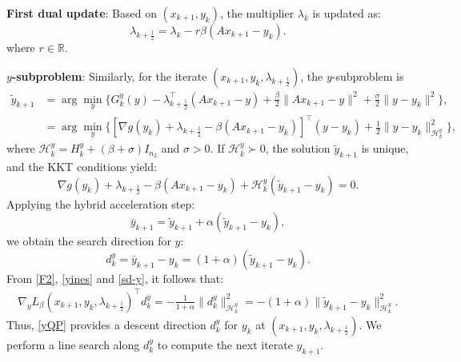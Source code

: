 \documentclass[pdflatex,sn-mathphys-num]{sn-jnl}%
\theoremstyle{thmstyleone}%
\theoremstyle{thmstyletwo}%
\theoremstyle{thmstylethree}%
\begin{document}
\textbf{First dual update}: Based on $(x_{k+1},y_k)$, the multiplier $\lambda_{k}$ is updated as:
\begin{equation}\label{lambda1}
\lambda_{k+\frac{1}{2}} = \lambda_{k}-r \beta(A x_{k+1}-y_{k}).
\end{equation}
where $r\in \mathbb{R}$.

\textbf{$y$-subproblem}: Similarly, for the iterate $(x_{k+1},y_k,\lambda_{k+\frac{1}{2}})$, the $y$-subproblem is
\begin{align}
\tilde{y}_{k+1}&=\arg\min_y\{G_k^g(y)-\lambda_{k+\frac{1}{2}}^{\top}(A x_{k+1}-y)+\frac{\beta}{2}\|A x_{k+1}-y\|^2+\frac{\sigma}{2}\|y-y_{k}\|^{2}\},\nonumber\\
&=\arg\min_y\{[\nabla g (y_{k})+\lambda_{k+\frac{1}{2}}-\beta(A x_{k+1}-y_{k})]^{\top}(y-y_{k})+\frac{1}{2}\|y-y_{k}\|_{\mathcal{H}_k^y}^{2}\},\label{yQP}
\end{align}
where $\label{yQP_H}\mathcal{H}_k^y=H_k^y+(\beta+\sigma) I_{n_2}$ and $\sigma>0$. If $\mathcal{H}_k^y\succ0$, the solution $\tilde{y}_{k+1}$ is unique, and the KKT conditions yield:
\begin{equation}\label{yoc}
\nabla g (y_{k})+\lambda_{k+\frac{1}{2}}-\beta(A x_{k+1}-y_{k})+\mathcal{H}_k^y(\tilde{y}_{k+1}-y_{k})=0.
\end{equation}
Applying the hybrid acceleration step:
\begin{equation}\label{yines}
\bar{y}_{k+1}=\tilde{y}_{k+1}+\alpha(\tilde{y}_{k+1}-y_{k}),
\end{equation}
we obtain the search direction for $y$:
\begin{equation}\label{sd-y}
d_{k}^{y} = \bar{y}_{k+1}-y_{k}=(1+\alpha)(\tilde{y}_{k+1}-y_{k}).
\end{equation}
From \eqref{F2}, \eqref{yines} and \eqref{sd-y}, it follows that:
\[\begin{aligned}
\nabla _y L_{\beta}(x_{k+1},y_k,\lambda_{k+\frac{1}{2}})^{\top}d_k^y
= - \frac{1}{1+\alpha}\|d_k^y\|_{\mathcal{H}_k^y}^2
=-(1+\alpha)\|\tilde{y}_{k+1}-y_{k}\|_{\mathcal{H}_k^y}^2.\label{yd}
\end{aligned}\]
Thus, \eqref{yQP} provides a descent direction $d_{k}^{y}$ for $y_k$ at $(x_{k+1},y_k,\lambda_{k+\frac{1}{2}})$.
We perform a line search along $d_{k}^{y}$ to compute the next iterate $y_{k+1}$.
\end{document}
